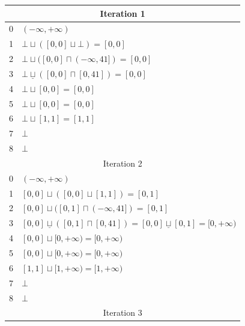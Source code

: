 \documentclass[a4paper]{article}
\def\lub{\sqcup}
\def\xlub{\underline\lub}
\def\glb{\sqcap}
\begin{document}
\begin{tabular}{|c|l|}
\hline
\multicolumn{2}{|c|}{Iteration 1} \\
\hline
0 & $ (-\infty, +\infty) $                                                          \\
1 & $ \bot \lub ([0, 0] \lub \bot) = [0, 0] $                                       \\
2 & $ \bot \lub ([0, 0] \glb (-\infty, 41]) = [0, 0] $                              \\
3 & $ \bot \xlub ([0, 0] \glb [0, 41]) = [0, 0] $                                   \\
4 & $ \bot \lub [0, 0] = [0, 0] $                                                   \\
5 & $ \bot \lub [0, 0] = [0, 0] $                                                   \\
6 & $ \bot \lub [1, 1] = [1, 1] $                                                   \\
7 & $ \bot $                                                                        \\
8 & $ \bot $                                                                        \\
\hline
\multicolumn{2}{|c|}{Iteration 2} \\
\hline
0 & $ (-\infty, +\infty) $                                                          \\
1 & $ [0, 0] \lub ([0, 0] \lub [1, 1]) = [0, 1] $                                   \\
2 & $ [0, 0] \lub ([0, 1] \glb (-\infty, 41]) = [0, 1] $                            \\
3 & $ [0, 0] \xlub ([0, 1] \glb [0, 41]) = [0, 0] \xlub [0, 1] = [0, +\infty) $     \\
4 & $ [0, 0] \lub [0, +\infty) = [0, +\infty) $                                     \\
5 & $ [0, 0] \lub [0, +\infty) = [0, +\infty) $                                     \\
6 & $ [1, 1] \lub [1, +\infty) = [1, +\infty) $                                     \\
7 & $ \bot $                                                                        \\
8 & $ \bot $                                                                        \\
\hline
\multicolumn{2}{|c|}{Iteration 3} \\

\end{tabular}
\end{document}
